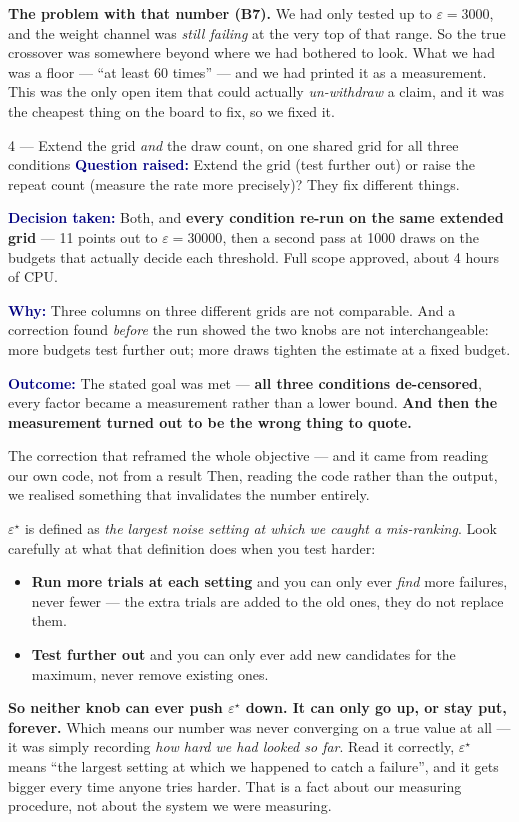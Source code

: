 \documentclass[11pt]{article}
\newcommand{\eps}{\ensuremath{\varepsilon}}
\newcommand{\epsst}{\ensuremath{\varepsilon^{\star}}}
\newcommand{\qlabel}[1]{\textbf{\textcolor{navy}{#1}}\;}
\begin{document}
\textbf{The problem with that number (B7).} We had only tested up to $\eps = 3000$, and the weight
channel was \emph{still failing} at the very top of that range. So the true crossover was somewhere
beyond where we had bothered to look. What we had was a floor --- ``at least 60 times'' --- and we had
printed it as a measurement. This was the only open item that could actually \emph{un-withdraw} a claim,
and it was the cheapest thing on the board to fix, so we fixed it.

\begin{decision}{4 --- Extend the grid \emph{and} the draw count, on one shared grid for all three conditions}
\qlabel{Question raised:} Extend the grid (test further out) or raise the repeat count (measure the
rate more precisely)? They fix different things.

\qlabel{Decision taken:} Both, and \textbf{every condition re-run on the same extended grid} --- 11
points out to $\eps=30000$, then a second pass at 1000 draws on the budgets that actually decide each
threshold. Full scope approved, about 4 hours of CPU.

\qlabel{Why:} Three columns on three different grids are not comparable. And a correction found
\emph{before} the run showed the two knobs are not interchangeable: more budgets test further out;
more draws tighten the estimate at a fixed budget.

\qlabel{Outcome:} The stated goal was met --- \textbf{all three conditions de-censored}, every factor
became a measurement rather than a lower bound. \textbf{And then the measurement turned out to be the
wrong thing to quote.}
\end{decision}

\begin{keybox}{The correction that reframed the whole objective --- and it came from reading our own code, not from a result}
Then, reading the code rather than the output, we realised something that invalidates the number
entirely.

\epsst{} is defined as \emph{the largest noise setting at which we caught a mis-ranking}. Look carefully
at what that definition does when you test harder:

\begin{itemize}[topsep=2pt]
\item \textbf{Run more trials at each setting} and you can only ever \emph{find} more failures, never
fewer --- the extra trials are added to the old ones, they do not replace them.
\item \textbf{Test further out} and you can only ever add new candidates for the maximum, never remove
existing ones.
\end{itemize}

\textbf{So neither knob can ever push \epsst{} down. It can only go up, or stay put, forever.} Which
means our number was never converging on a true value at all --- it was simply recording \emph{how hard
we had looked so far}. Read it correctly, \epsst{} means ``the largest setting at which we happened to
catch a failure'', and it gets bigger every time anyone tries harder. That is a fact about our
measuring procedure, not about the system we were measuring.
\end{keybox}
\end{document}

